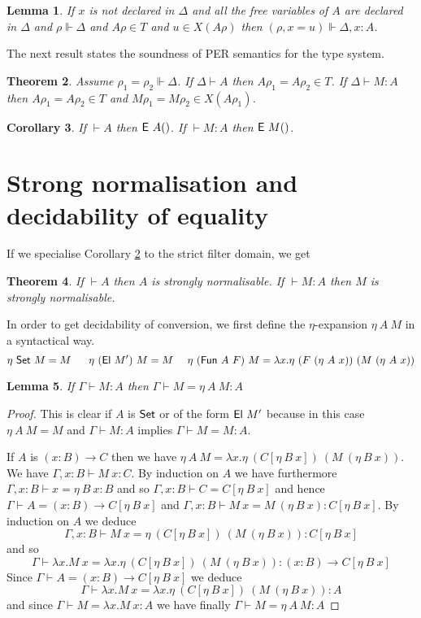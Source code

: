 \documentclass[11pt]{article}
\newtheorem{theorem}{Theorem}[section]
\newtheorem{lemma}[theorem]{Lemma}
\newtheorem{corollary}[theorem]{Corollary}
\def\Ex{\hbox{\sf E}}
\def\FUN{\hbox{\sf Fun}}
\def\SET{\hbox{\sf Set}}
\def\EL{\hbox{\sf El}}
\begin{document}
\begin{lemma}
If $x$ is not declared in $\Delta$ and all the free variables of $A$ are declared
in $\Delta$ and $\rho\Vdash\Delta$ and $A\rho\in T$ and $u\in X(A\rho)$ then
$(\rho,x=u)\Vdash \Delta,x{:}A$.
\end{lemma}

 The next result states the soundness of PER semantics for the type system.

\begin{theorem}\label{sem}
  Assume $\rho_1=\rho_2\Vdash\Delta$. If $\Delta\vdash A$ then $A\rho_1=A\rho_2\in T$. If
$\Delta\vdash M{:}A$ then $A\rho_1=A\rho_2\in T$ and $M\rho_1=M\rho_2\in X(A\rho_1)$.
\end{theorem}

\begin{corollary}
If $\vdash A$ then $\Ex~A()$. If $\vdash M:A$ then $\Ex~M()$.
\end{corollary}


\section{Strong normalisation and decidability of equality}

 If we specialise Corollary \ref{sem} to the strict filter domain, we get

\begin{theorem}
If $\vdash A$ then $A$ is strongly normalisable. If $\vdash M:A$ then $M$
is strongly normalisable.
\end{theorem}

 In order to get decidability of conversion, we first define the $\eta$-expansion
$\eta~A~M$ in a syntactical way.
$$
\eta~\SET~M = M~~~~~
\eta~(\EL~M')~M = M~~~~
\eta~(\FUN~A~F)~M = \lambda x.\eta~(F~(\eta~A~x))~(M~(\eta~A~x))
$$

\begin{lemma}\label{exp}
If $\Gamma\vdash M:A$ then $\Gamma\vdash M = \eta~A~M:A$
\end{lemma}

\begin{proof}
This is clear if $A$ is $\SET$ or of the form $\EL~M'$ because in this case
$\eta~A~M = M$ and $\Gamma\vdash M:A$ implies $\Gamma\vdash M = M :A$.

 If $A$ is $(x{:}B)\rightarrow C$ then we have
$\eta~A~M = \lambda x.\eta~(C[\eta~B~x])~(M~(\eta~B~x))$. We have $\Gamma,x:B\vdash M~x:C$.
By induction on $A$ we have furthermore
$\Gamma,x:B\vdash x = \eta~B~x:B$ and so $\Gamma,x:B\vdash C = C[\eta~B~x]$ and
hence $\Gamma\vdash A = (x:B)\rightarrow C[\eta~B~x]$ and 
 $\Gamma,x:B\vdash M~x = M~(\eta~B~x):C[\eta~B~x].$ By induction on $A$
we deduce 
$$\Gamma,x:B\vdash M~x = \eta~(C[\eta~B~x])~(M~(\eta~B~x)):C[\eta~B~x]$$
and so
$$\Gamma\vdash \lambda x.M~x = \lambda x.\eta~(C[\eta~B~x])~(M~(\eta~B~x)):(x:B)\rightarrow C[\eta~B~x]$$
Since $\Gamma\vdash A = (x:B)\rightarrow C[\eta~B~x]$ we deduce
$$\Gamma\vdash \lambda x.M~x = \lambda x.\eta~(C[\eta~B~x])~(M~(\eta~B~x)):A$$
and since $\Gamma\vdash M = \lambda x.M~x:A$ we have finally
$\Gamma\vdash M = \eta~A~M:A$ \end{proof}
\end{document}
